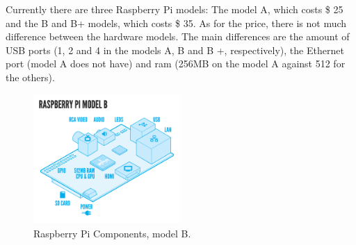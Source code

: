 \documentclass{acm_proc_article-sp}
\begin{document}
\newline
\newline
Currently there are three  Raspberry Pi models: The model A, which costs \$ 25 and the B and B+ models, which costs \$ 35. As for the price, there is not much difference between the hardware models. The main differences are the amount of USB ports (1, 2 and 4 in the models A, B and B +, respectively), the Ethernet port (model A does not have) and ram (256MB on the model A against 512 for the others).
\begin{figure}[h]
    \includegraphics[width=0.5\textwidth,natwidth=610,natheight=642]{pictures/RaspiModelB.png}
    \caption{Raspberry Pi Components, model B. \protect\cite{raspberryFaq}}
    \label{fig:raspi}
\end{figure}
\end{document}
